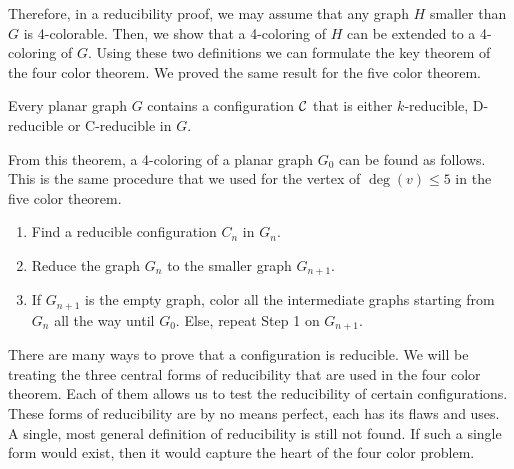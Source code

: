 Therefore, in a reducibility proof, we may assume that any graph $H$ smaller than $G$ is 4-colorable. Then, we show that a 4-coloring of $H$ can be extended to a 4-coloring of $G$.
Using these two definitions we can formulate the key theorem of the four color theorem. We proved the same result for the five color theorem.

\begin{theorem}
    \label{funda1}
    Every planar graph $G$ contains a configuration $\mathcal{C}$ that is either $k$-reducible, D-reducible or C-reducible in $G$.
\end{theorem}

From this theorem, a 4-coloring of a planar graph $G_0$ can be found as follows. This is the same procedure that we used for the vertex of $\deg(v)\leq 5$ in the five color theorem.

\begin{enumerate}
    \item Find a reducible configuration $C_n$ in $G_n$.
    \item Reduce the graph $G_n$ to the smaller graph $G_{n+1}$.
    \item If $G_{n+1}$ is the empty graph, color all the intermediate graphs starting from $G_n$ all the way until $G_0$. Else, repeat Step 1 on $G_{n+1}$.
\end{enumerate}

There are many ways to prove that a configuration is reducible. We will be treating the three central forms of reducibility that are used in the four color theorem. Each of them allows us to test the reducibility of certain configurations. These forms of reducibility are by no means perfect, each has its flaws and uses. A single, most general definition of reducibility is still not found. If such a single form would exist, then it would capture the heart of the four color problem.